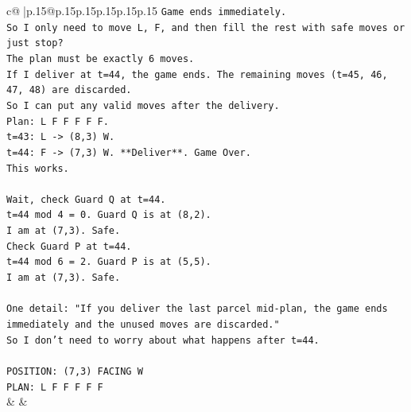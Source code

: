 \documentclass{article}
\begin{document}
{\begin{supertabular}{c@{$\;$}|p{.15\linewidth}@{}p{.15\linewidth}p{.15\linewidth}p{.15\linewidth}p{.15\linewidth}p{.15\linewidth}}
{{{\texttt{Game ends immediately.} \\
\texttt{So I only need to move L, F, and then fill the rest with safe moves or just stop?} \\
\texttt{The plan must be exactly 6 moves.} \\
\texttt{If I deliver at t=44, the game ends. The remaining moves (t=45, 46, 47, 48) are discarded.} \\
\texttt{So I can put any valid moves after the delivery.} \\
\texttt{Plan: L F F F F F.} \\
\texttt{t=43: L {-}> (8,3) W.} \\
\texttt{t=44: F {-}> (7,3) W. **Deliver**. Game Over.} \\
\texttt{This works.} \\
\\ 
\texttt{Wait, check Guard Q at t=44.} \\
\texttt{t=44 mod 4 = 0. Guard Q is at (8,2).} \\
\texttt{I am at (7,3). Safe.} \\
\texttt{Check Guard P at t=44.} \\
\texttt{t=44 mod 6 = 2. Guard P is at (5,5).} \\
\texttt{I am at (7,3). Safe.} \\
\\ 
\texttt{One detail: "If you deliver the last parcel mid{-}plan, the game ends immediately and the unused moves are discarded."} \\
\texttt{So I don't need to worry about what happens after t=44.} \\
\\ 
\texttt{POSITION: (7,3) FACING W} \\
\texttt{PLAN: L F F F F F} \\
            }
        }
    }
    & & \\ \\


\end{supertabular}}
\end{document}
